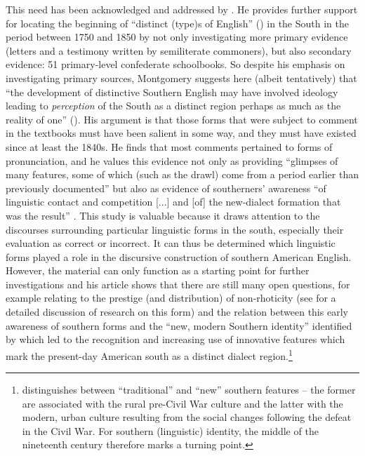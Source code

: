This need has been acknowledged and addressed by \citet{Montgomery2015}. He provides further support for locating the beginning of “distinct (type)s of English” (\citeyear[99]{Montgomery2015}) in the South in the period between 1750 and 1850 by not only investigating more primary evidence (letters and a testimony written by semiliterate commoners), but also secondary evidence: 51 primary-level confederate schoolbooks. So despite his emphasis on investigating primary sources, Montgomery suggests here (albeit tentatively) that “the development of distinctive Southern English may have involved ideology leading to \emph{perception} of the South as a distinct region perhaps as much as the reality of one” (\citeyear[99]{Montgomery2015}). His argument is that those forms that were subject to comment in the textbooks must have been salient in some way, and they must have existed since at least the 1840s. He finds that most comments pertained to forms of pronunciation, and he values this evidence not only as providing “glimpses of many features, some of which (such as the drawl) come from a period earlier than previously documented” but also as evidence of southerners’ awareness “of linguistic contact and competition [...] and [of] the new-dialect formation that was the result” \citep[114]{Montgomery2015}. This study is valuable because it draws attention to the discourses surrounding particular linguistic forms in the south, especially their evaluation as correct or incorrect. It can thus be determined which linguistic forms played a role in the discursive construction of southern American English. However, the material can only function as a starting point for further investigations and his article shows that there are still many open questions, for example relating to the prestige (and distribution) of non-rhoticity (see  for a detailed discussion of research on this form) and the relation between this early awareness of southern forms and the “new, modern Southern identity” identified by \citet[299]{Schneider2007} which led to the recognition and increasing use of innovative features which mark the present-day American south as a distinct dialect region.\footnote{\citet{Schneider2007} distinguishes between “traditional” and “new” southern features – the former are associated with the rural pre-Civil War culture and the latter with the modern, urban culture resulting from the social changes following the defeat in the Civil War. For southern (linguistic) identity, the middle of the nineteenth century therefore marks a turning point.}

